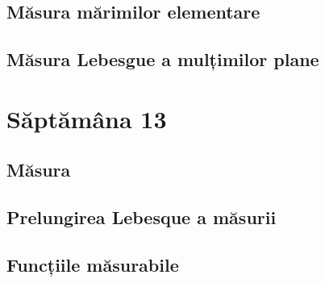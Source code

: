 \documentclass[a4paper,12pt]{article}
\theoremstyle{change}
\begin{document}

\subsection{Măsura mărimilor elementare}

\subsection{Măsura Lebesgue a mulțimilor plane}

\section{Săptămâna 13}


\subsection{Măsura}

\subsection{Prelungirea Lebesque a măsurii}


\subsection{Funcțiile măsurabile}
\end{document}
